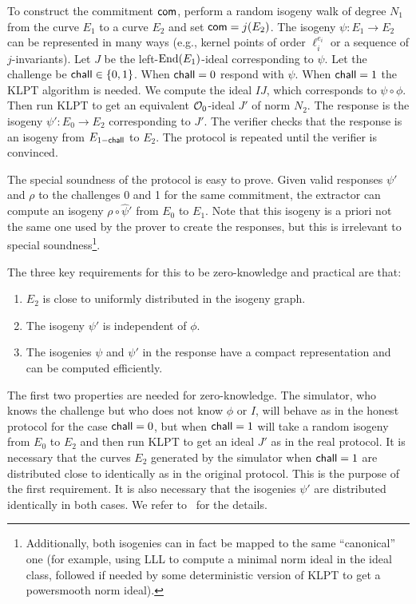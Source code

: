 To construct the commitment $\mathsf{com}$, perform a random isogeny walk of degree $N_1$ from the curve $E_1$ to a curve $E_2$ and set $\mathsf{com} = j(E_2)$.
The isogeny $\psi : E_1 \to E_2$ can be represented in many ways (e.g., kernel points of order $\ell_i^{e_i}$ or a sequence of $j$-invariants).
Let $J$ be the left-$\text{End}(E_1)$-ideal corresponding to $\psi$.
Let the challenge be $\mathsf{chall} \in \{0,1\}$.
When $\mathsf{chall}=0$ respond with $\psi$.
When $\mathsf{chall}=1$ the KLPT algorithm is needed. We compute the ideal $IJ$, which corresponds to $\psi \circ \phi$.
Then run KLPT to get an equivalent $\mathcal{O}_0$-ideal $J'$ of norm $N_2$. The response is the isogeny $\psi' : E_0 \to E_2$ corresponding to $J'$.
The verifier checks that the response is an isogeny from $E_{1-\mathsf{chall}}$ to $E_2$.
The protocol is repeated until the verifier is convinced.

The special soundness of the protocol is easy to prove. Given valid responses $\psi'$ and $\rho$ to the challenges 0 and 1 for the same commitment, the extractor can compute an isogeny $\rho \circ \hat\psi'$ from $E_0$ to $E_1$. Note that this isogeny is a priori not the same one used by the prover to create the responses, but this is irrelevant to special soundness\footnote{Additionally, both isogenies can in fact be mapped to the same ``canonical'' one (for example, using LLL to compute a minimal norm ideal in the ideal class, followed if needed by some deterministic version of KLPT to get a powersmooth norm ideal).}.


The three key requirements for this to be zero-knowledge and practical are that:
\begin{enumerate}
    \item $E_2$ is close to uniformly distributed in the isogeny graph.
    \item The isogeny $\psi'$ is independent of $\phi$.
    \item The isogenies $\psi$ and $\psi'$ in the response have a compact representation and can be computed efficiently.
\end{enumerate}
The first two properties are needed for zero-knowledge. 
The simulator, who knows the challenge but who does not know $\phi$ or $I$, will behave as in the honest protocol for the case $\mathsf{chall}=0$, but when $\mathsf{chall}=1$ will take a random isogeny from $E_0$ to $E_2$ and then run KLPT to get an ideal $J'$ as in the real protocol. 
It is necessary that the curves $E_2$ generated by the simulator when $\mathsf{chall}=1$ are distributed close to identically as in the original protocol. This is the purpose of the first requirement.
It is also necessary that the isogenies $\psi'$ are distributed identically in both cases.
We refer to~\cite{GPS20} for the details.


